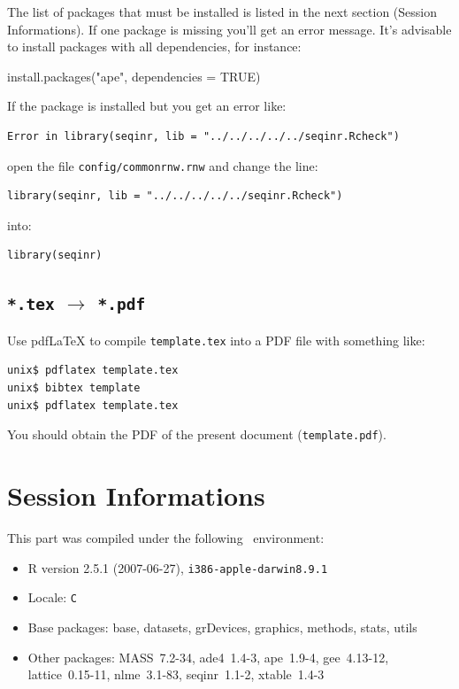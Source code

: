 \documentclass{article}
\begin{document}
The list of \Rlogo{} packages that must be installed is listed
in the next section (Session Informations). 
If one package is missing you'll get an error message.
It's advisable to install packages with all dependencies, for instance:

\begin{Schunk}
\begin{Sinput}
 install.packages("ape", dependencies = TRUE)
\end{Sinput}
\end{Schunk}

If the \seqinr{} package is installed but you get an error like:

\begin{verbatim}
Error in library(seqinr, lib = "../../../../../seqinr.Rcheck")
\end{verbatim}

open the file \texttt{config/commonrnw.rnw} and change the line:

\begin{verbatim}
library(seqinr, lib = "../../../../../seqinr.Rcheck")
\end{verbatim}

into:

\begin{verbatim}
library(seqinr)
\end{verbatim}

\subsection{\texttt{*.tex} $\rightarrow$ \texttt{*.pdf}}

Use pdf\LaTeX{} to compile \texttt{template.tex} into a PDF file
with something like:

\begin{verbatim}
unix$ pdflatex template.tex
unix$ bibtex template
unix$ pdflatex template.tex
\end{verbatim}

You should obtain the PDF of the present document (\texttt{template.pdf}).



\section{Session Informations}

This part was compiled under the following \Rlogo{}~environment:

\begin{itemize}
  \item R version 2.5.1 (2007-06-27), \verb|i386-apple-darwin8.9.1|
  \item Locale: \verb|C|
  \item Base packages: base, datasets, grDevices, graphics, methods,
    stats, utils
  \item Other packages: MASS~7.2-34, ade4~1.4-3, ape~1.9-4,
    gee~4.13-12, lattice~0.15-11, nlme~3.1-83, seqinr~1.1-2,
    xtable~1.4-3
\end{itemize}

\clearpage
{}


\end{document}
